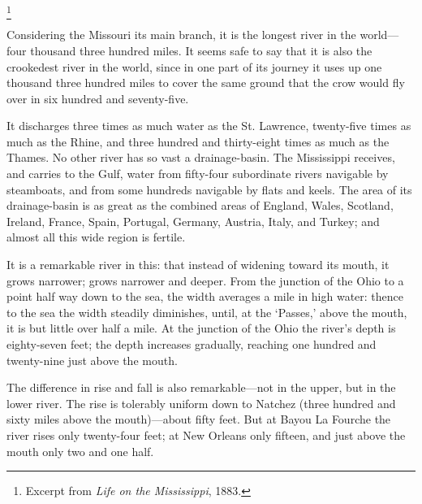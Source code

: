 \documentclass[../demo.tex]{novelette-subdoc}
\begin{document}
\begin{opening}
\null
{}
\footnote{Excerpt from \textit{Life on the Mississippi}, 1883.}
\null\null
\begin{blockindent}[4,4]
\end{blockindent}
\end{opening}


Considering the Missouri its main branch, it is the longest river in the
world---four thousand three hundred miles. It seems safe to say that it is
also the crookedest river in the world, since in one part of its journey
it uses up one thousand three hundred miles to cover the same ground that the
crow would fly over in six hundred and seventy-five.

It discharges three times as much water as the St. Lawrence, twenty-five times
as much as the Rhine, and three hundred and thirty-eight times as much as the
Thames. No other river has so vast a drainage-basin. The
Mississippi receives, and carries to the Gulf, water from
fifty-four subordinate rivers navigable by steamboats,
and from some hundreds navigable by flats and keels.
The area of its drainage-basin is as great as the combined areas of England,
Wales, Scotland, Ireland, France, Spain, Portugal, Germany, Austria, Italy,
and Turkey; and almost all this wide region is fertile.

It is a remarkable river in this: that instead of widening toward its
mouth, it grows narrower; grows narrower and deeper. From the junction
of the Ohio to a point half way down to the sea, the width averages a
mile in high water: thence to the sea the width steadily diminishes,
until, at the `Passes,' above the mouth, it is but little over half
a mile. At the junction of the Ohio the river's depth is
eighty-seven feet; the depth increases gradually, reaching one hundred
and twenty-nine just above the mouth.

The difference in rise and fall is also remarkable---not in the upper,
but in the lower river. The rise is tolerably uniform down to Natchez
(three hundred and sixty miles above the mouth)---about fifty feet.
But at Bayou La Fourche the river rises only twenty-four feet; at New
Orleans only fifteen, and just above the mouth only two and one half.
\end{document}

